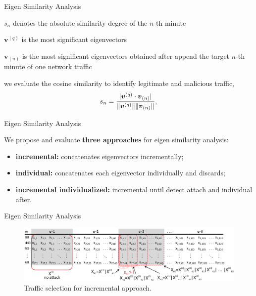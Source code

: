 \documentclass[newPxFont, numfooter, sectionpages]{beamer}
\DeclarePairedDelimiter\abs{\lvert}{\rvert}%
\DeclarePairedDelimiter\norm{\lVert}{\rVert}%
\begin{document}
\begin{frame}{Eigen Similarity Analysis}
	
	$s_n$ denotes the absolute similarity degree of the $n$-th minute
	
	$\boldsymbol{v}^{(q)}$ is the most significant eigenvectors

	$\boldsymbol{v}_{(n)}$ is the most significant eigenvectors obtained after append the target $n$-th minute of one network traffic

	we evaluate the cosine similarity to identify legitimate and malicious traffic,
	\begin{equation}
		\label{eq:eq11}
		s_n = \frac{\abs{\boldsymbol{v}^{(q)} \cdot \boldsymbol{v}_{(n)}}}{\norm{\boldsymbol{v}^{(q)}}\norm{\boldsymbol{v}_{(n)}}},
	\end{equation}

\end{frame}
\begin{frame}{Eigen Similarity Analysis}
	
	We propose and evaluate \textbf{three approaches} for eigen similarity analysis: 
	\begin{itemize}
		\item \textbf{incremental:} concatenates eigenvectors incrementally;
		\item \textbf{individual:} concatenates each eigenvector individually and discards;
		\item \textbf{incremental individualized:} incremental until detect attach and individual after.
	\end{itemize}

\end{frame}
\begin{frame}{Eigen Similarity Analysis}
	
	\begin{figure}[h!]
		\centering
	    \includegraphics[width=11.5cm]{../figures/incremental.eps}
	    \caption{Traffic selection for incremental approach.}
	    \label{fig:2_fig8}
	\end{figure}

\end{frame}
\end{document}
